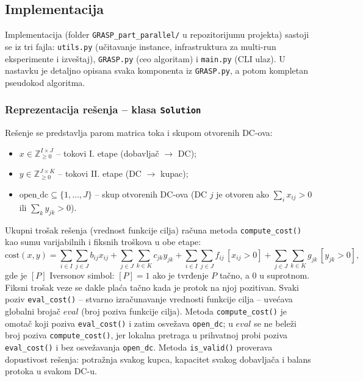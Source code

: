 \documentclass[12pt,a4paper]{article}
\begin{document}
\subsection{Implementacija}

Implementacija (folder \texttt{GRASP\_part\_parallel/} u repozitorijumu
projekta) sastoji se iz tri fajla: \texttt{utils.py} (učitavanje instance,
infrastruktura za multi-run eksperimente i izveštaj), \texttt{GRASP.py} (ceo
algoritam) i \texttt{main.py} (CLI ulaz). U nastavku je detaljno opisana svaka
komponenta iz \texttt{GRASP.py}, a potom kompletan pseudokod algoritma.

\subsubsection{Reprezentacija rešenja -- klasa \texttt{Solution}}

Rešenje se predstavlja parom matrica toka i skupom otvorenih DC-ova:
\begin{itemize}
  \item $x \in \mathbb{Z}_{\geq 0}^{I \times J}$ -- tokovi I. etape (dobavljač $\to$ DC);
  \item $y \in \mathbb{Z}_{\geq 0}^{J \times K}$ -- tokovi II. etape (DC $\to$ kupac);
  \item $\text{open\_dc} \subseteq \{1,\ldots,J\}$ -- skup otvorenih DC-ova
    (DC $j$ je otvoren ako $\sum_i x_{ij} > 0$ ili $\sum_k y_{jk} > 0$).
\end{itemize}

Ukupni trošak rešenja (vrednost funkcije cilja) računa metoda
\texttt{compute\_cost()} kao sumu varijabilnih i fiksnih troškova u obe etape:
\begin{equation} \label{eq:cost}
\text{cost}(x,y) = \sum_{i \in I}\sum_{j \in J} b_{ij}x_{ij}
+ \sum_{j \in J}\sum_{k \in K} c_{jk}y_{jk}
+ \sum_{i \in I}\sum_{j \in J} f_{ij}\,[x_{ij} > 0]
+ \sum_{j \in J}\sum_{k \in K} g_{jk}\,[y_{jk} > 0],
\end{equation}
gde je $[P]$ Iversonov simbol: $[P] = 1$ ako je tvrđenje $P$ tačno, a $0$ u
suprotnom. Fiksni trošak veze se dakle plaća tačno kada je protok na njoj
pozitivan. Svaki poziv \texttt{eval\_cost()} -- stvarno izračunavanje
vrednosti funkcije cilja -- uvećava globalni brojač $eval$ (broj poziva
funkcije cilja). Metoda \texttt{compute\_cost()} je omotač koji poziva
\texttt{eval\_cost()} i zatim osvežava \texttt{open\_dc}; u $eval$ se ne beleži
broj poziva \texttt{compute\_cost()}, jer lokalna pretraga u prihvatnoj probi
poziva \texttt{eval\_cost()} i bez osvežavanja \texttt{open\_dc}. Metoda
\texttt{is\_valid()} proverava dopustivost rešenja: potražnja svakog kupca,
kapacitet svakog dobavljača i balans protoka u svakom DC-u.
\end{document}
